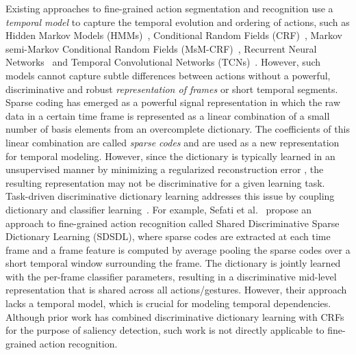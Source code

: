 \documentclass[10pt,twocolumn,letterpaper]{article}
\begin{document}
Existing approaches to fine-grained action segmentation and recognition use a \emph{temporal model} to capture the temporal evolution and ordering of actions, such as Hidden Markov Models (HMMs)~\cite{Kuehne:CVPR14,Tao:IPCAI12}, Conditional Random Fields (CRF)~\cite{Lea:WACV15,Lea:ICRA16}, Markov semi-Markov Conditional Random Fields (MsM-CRF)~\cite{Tao:MICCAI13}, Recurrent Neural Networks~\cite{Dipietro:MICCAI16,Richard:CoRR17} and Temporal Convolutional Networks (TCNs)~\cite{Lea:CVPR17}. However, such models cannot capture subtle differences between actions without a powerful, discriminative and robust \emph{representation of frames} or short temporal segments. Sparse coding has emerged as a powerful signal representation in which the raw data in a certain time frame is represented as a linear combination of a small number of basis elements from an overcomplete dictionary. The coefficients of this linear combination are called \emph{sparse codes} and are used as a new representation for temporal modeling. However, since the dictionary is typically learned in an unsupervised manner by minimizing a regularized reconstruction error \cite{Elad:TSP06}, the resulting representation may not be discriminative for a given learning task. Task-driven discriminative dictionary learning addresses this issue by coupling dictionary and classifier learning~\cite{Mairal:NIPS09}. For example, Sefati et al.~\cite{Sefati:M2CAI15} propose an approach to fine-grained action recognition called Shared Discriminative Sparse Dictionary Learning (SDSDL), where sparse codes are extracted at each time frame and a frame feature is computed by average pooling the sparse codes over a short temporal window surrounding the frame. The dictionary is jointly learned with the per-frame classifier parameters, resulting in a discriminative mid-level representation that is shared across all actions/gestures. However, their approach lacks a temporal model, which is crucial for modeling temporal dependencies. Although prior work \cite{Yang:PAMI17}  has combined discriminative dictionary learning with CRFs for the purpose of saliency detection, such work is not directly applicable to fine-grained action recognition.
\end{document}
